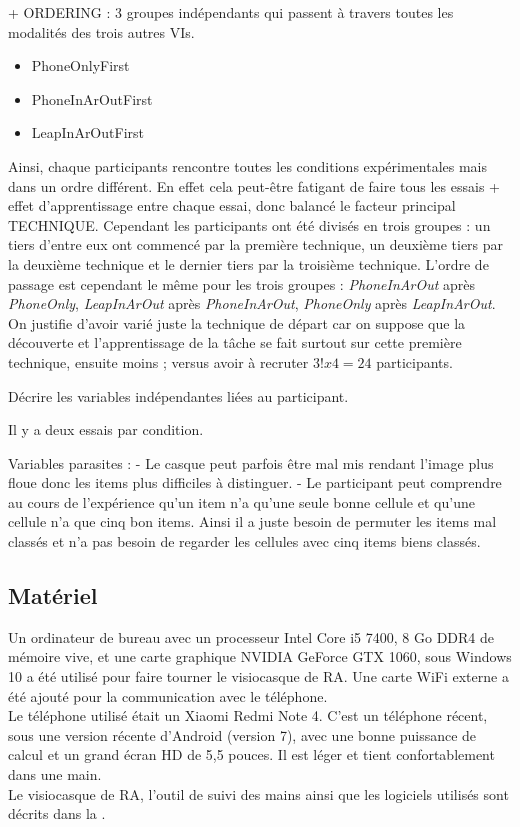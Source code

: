 + ORDERING : 3 groupes indépendants qui passent à travers toutes les modalités des trois autres VIs.
\begin{itemize}
  \item PhoneOnlyFirst
  \item PhoneInArOutFirst
  \item LeapInArOutFirst
\end{itemize}

Ainsi, chaque participants rencontre toutes les conditions expérimentales mais dans un ordre différent. En effet cela peut-être fatigant de faire tous les essais + effet d'apprentissage entre chaque essai, donc balancé le facteur principal \textsc{TECHNIQUE}. Cependant les participants ont été divisés en trois groupes : un tiers d'entre eux ont commencé par la première technique, un deuxième tiers par la deuxième technique et le dernier tiers par la troisième technique. L'ordre de passage est cependant le même pour les trois groupes : \textit{PhoneInArOut} après \textit{PhoneOnly}, \textit{LeapInArOut} après \textit{PhoneInArOut}, \textit{PhoneOnly} après \textit{LeapInArOut}. On justifie d'avoir varié juste la technique de départ car on suppose que la découverte et l'apprentissage de la tâche se fait surtout sur cette première technique, ensuite moins ; versus avoir à recruter $3! x 4 = 24$ participants.

Décrire les variables indépendantes liées au participant.

Il y a deux essais par condition.

Variables parasites : 
- Le casque peut parfois être mal mis rendant l'image plus floue donc les items plus difficiles à distinguer.
- Le participant peut comprendre au cours de l'expérience qu'un item n'a qu'une seule bonne cellule et qu'une cellule n'a que cinq bon items. Ainsi il a juste besoin de permuter les items mal classés et n'a pas besoin de regarder les cellules avec cinq items biens classés. 

\subsection{Matériel}
Un ordinateur de bureau avec un processeur Intel Core i5 7400, 8 Go DDR4 de mémoire vive, et une carte graphique NVIDIA GeForce GTX 1060, sous Windows 10 a été utilisé pour faire tourner le visiocasque de RA. Une carte WiFi externe a été ajouté pour la communication avec le téléphone.\\
Le téléphone utilisé était un Xiaomi Redmi Note 4. C'est un téléphone récent, sous une version récente d'Android (version 7), avec une bonne puissance de calcul et un grand écran HD de 5,5 pouces. Il est léger et tient confortablement dans une main.\\
Le visiocasque de RA, l'outil de suivi des mains ainsi que les logiciels utilisés sont décrits dans la .

